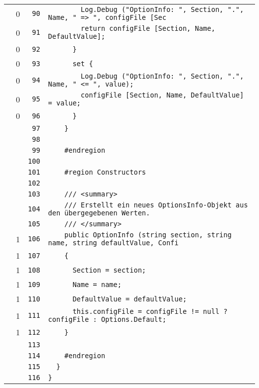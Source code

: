 \documentclass[a4paper,10pt]{article}
\begin{document}
\begin{longtable}[l]{lrrl}
\cellcolor{red} & 0 & \verb~90~ & \verb~        Log.Debug ("OptionInfo: ", Section, ".", Name, " => ", configFile [Sec~\\
\cellcolor{red} & 0 & \verb~91~ & \verb~        return configFile [Section, Name, DefaultValue];~\\
\cellcolor{red} & 0 & \verb~92~ & \verb~      }~\\
\cellcolor{red} & 0 & \verb~93~ & \verb~      set {~\\
\cellcolor{red} & 0 & \verb~94~ & \verb~        Log.Debug ("OptionInfo: ", Section, ".", Name, " <= ", value);~\\
\cellcolor{red} & 0 & \verb~95~ & \verb~        configFile [Section, Name, DefaultValue] = value;~\\
\cellcolor{red} & 0 & \verb~96~ & \verb~      }~\\
\cellcolor{gray} &  & \verb~97~ & \verb~    }~\\
\cellcolor{gray} &  & \verb~98~ & \verb~~\\
\cellcolor{gray} &  & \verb~99~ & \verb~    #endregion~\\
\cellcolor{gray} &  & \verb~100~ & \verb~~\\
\cellcolor{gray} &  & \verb~101~ & \verb~    #region Constructors~\\
\cellcolor{gray} &  & \verb~102~ & \verb~~\\
\cellcolor{gray} &  & \verb~103~ & \verb~    /// <summary>~\\
\cellcolor{gray} &  & \verb~104~ & \verb~    /// Erstellt ein neues OptionsInfo-Objekt aus den übergegebenen Werten.~\\
\cellcolor{gray} &  & \verb~105~ & \verb~    /// </summary>~\\
\cellcolor{green} & 1 & \verb~106~ & \verb~    public OptionInfo (string section, string name, string defaultValue, Confi~\\
\cellcolor{green} & 1 & \verb~107~ & \verb~    {~\\
\cellcolor{green} & 1 & \verb~108~ & \verb~      Section = section;~\\
\cellcolor{green} & 1 & \verb~109~ & \verb~      Name = name;~\\
\cellcolor{green} & 1 & \verb~110~ & \verb~      DefaultValue = defaultValue;~\\
\cellcolor{green} & 1 & \verb~111~ & \verb~      this.configFile = configFile != null ? configFile : Options.Default;~\\
\cellcolor{green} & 1 & \verb~112~ & \verb~    }~\\
\cellcolor{gray} &  & \verb~113~ & \verb~~\\
\cellcolor{gray} &  & \verb~114~ & \verb~    #endregion~\\
\cellcolor{gray} &  & \verb~115~ & \verb~  }~\\
\cellcolor{gray} &  & \verb~116~ & \verb~}~\\
\end{longtable}
\newpage
\end{document}
